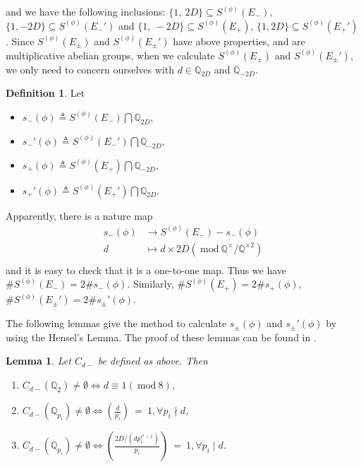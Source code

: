 \documentclass{amsart}
\numberwithin{equation}{section}
\theoremstyle{plain}
\newtheorem{lemma_}[equation]{Lemma}
\theoremstyle{definition}
\newtheorem{def_}[equation]{Definition}
\newcommand{\lemm}[1]{\begin{lemma_}#1\end{lemma_}}
\newcommand{\defi}[1]{\begin{def_}#1\end{def_}}
\newcommand{\QQ}{\mathbb Q}
\renewcommand{\mod}[1]{\ \mathrm{mod}\ #1}  %
\begin{document}
and we have the following inclusions:
$\{1, \ 2D\} \subseteq S^{(\phi)}(E_-) $, $\{1, -2D\} \subseteq S^{({\phi})}({E_-'})$ and $\{1, \ -2D\} \subseteq S^{(\phi)}(E_+) $, $\{1, 2D\} \subseteq S^{({\phi})}({E_+'})$. Since $S^{(\phi)}(E_\pm) $ and $S^{({\phi})}({E_\pm'})$ have above properties, and are
multiplicative abelian groups, when we calculate $S^{(\phi)}(E_\pm)$ and $S^{({\phi})}({E_\pm'})$,
we only need to concern ourselves with $d \in \QQ_{2D}$ and $\QQ_{-2D}$.


\defi{Let

\begin{itemize}
\item $s_-(\phi) \triangleq  S^{(\phi)}(E_-) \bigcap \QQ_{2D}$,
\item $s_-'(\phi) \triangleq S^{({\phi})}({E_-'}) \bigcap \QQ_{-2D}$,
\item $s_+(\phi) \triangleq  S^{(\phi)}(E_+) \bigcap \QQ_{-2D}$,
\item $s_+'(\phi) \triangleq S^{({\phi})}({E_+'}) \bigcap \QQ_{2D}$.
\end{itemize}
}
Apparently, there is a nature map
$$
\begin{aligned}
s_-(\phi) &\rightarrow S^{(\phi)}(E_-) - s_-(\phi)\\
d &\mapsto d \times 2D (\mod \QQ^{\times}/\QQ^{\times 2})  \\
\end{aligned}
$$
and it is easy to check that it is a one-to-one map. Thus we have $ \#S^{(\phi)}(E_-) = 2\# s_-(\phi)$. Similarly, $ \# S^{(\phi)}(E_+) = 2\# s_+(\phi)$, $\#S^{({\phi})}({E_\pm'}) = 2 \# s_\pm'(\phi)$.

The following lemmas give the method to calculate $ s_\pm(\phi)$ and $s_\pm'(\phi) $ by using the Hensel's Lemma. The proof of these lemmas can be found in \cite{zeng}.

\lemm{\label{lem1}
Let $C_{d-}$ be defined as above. Then\vspace{1.5ex}

\begin{enumerate}
\item[(1)] $C_{d-}(\mathbb{Q}_2) \neq \emptyset \Leftrightarrow d  \equiv 1 (\mod 8)$, \vspace{1.5ex}
\item[(2)] $C_{d-}(\mathbb{Q}_{p_i}) \neq \emptyset \Leftrightarrow (\frac{d}{p_i}) \ =\ 1 , \forall p_i \nmid d$,
\item[(3)] $C_{d-}(\mathbb{Q}_{p_i}) \neq \emptyset \Leftrightarrow (\frac{2D/(dp_i^{e^i-1})}{p_i}) \ =\ 1 , \forall  p_i \mid d$.
\end{enumerate}
}
\end{document}
